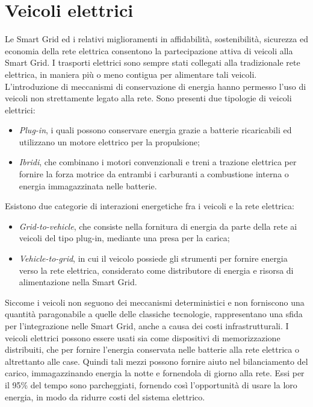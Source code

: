 \section{Veicoli elettrici}
Le Smart Grid ed i relativi miglioramenti in affidabilità, sostenibilità, sicurezza ed economia della rete elettrica consentono la partecipazione attiva di veicoli alla Smart Grid. I trasporti elettrici sono sempre stati collegati alla tradizionale rete elettrica, in maniera più o meno contigua per alimentare tali veicoli. L'introduzione di meccanismi di conservazione di energia hanno permesso l'uso di veicoli non strettamente legato alla rete.
Sono presenti due tipologie di veicoli elettrici:
\begin{itemize}
	\item \emph{Plug-in}, i quali possono conservare energia grazie a batterie ricaricabili ed utilizzano un motore elettrico per la propulsione;
	\item \emph{Ibridi}, che combinano i motori convenzionali e treni a trazione elettrica per fornire la forza motrice da entrambi i carburanti a combustione interna o energia immagazzinata nelle batterie.  
\end{itemize}     

Esistono due categorie di interazioni energetiche fra i veicoli e la rete elettrica:
\begin{itemize}
	\item \emph{Grid-to-vehicle}, che consiste nella fornitura di energia da parte della rete ai veicoli del tipo plug-in, mediante una presa per la carica;
	\item \emph{Vehicle-to-grid}, in cui il veicolo possiede gli strumenti per fornire energia verso la rete elettrica, considerato come distributore di energia e risorsa di alimentazione nella Smart Grid.
\end{itemize}

Siccome i veicoli non seguono dei meccanismi deterministici e non forniscono una quantità paragonabile a quelle delle classiche tecnologie, rappresentano una sfida per l'integrazione nelle Smart Grid, anche a causa dei costi infrastrutturali. 
I veicoli elettrici possono essere usati sia come dispositivi di memorizzazione distribuiti, che per fornire l'energia conservata nelle batterie alla rete elettrica o altrettanto alle case. 
Quindi tali mezzi possono fornire aiuto nel bilanciamento del carico, immagazzinando energia la notte e fornendola di giorno alla rete. Essi per il 95\% del tempo sono parcheggiati, fornendo così l'opportunità di usare la loro energia, in modo da ridurre costi del sistema elettrico.


